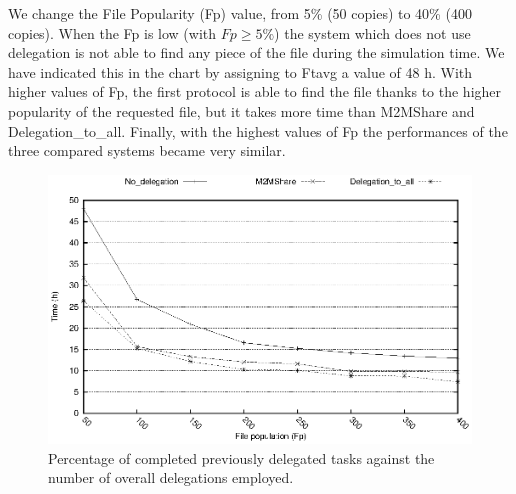 We change the File Popularity (Fp) value, from 5\% (50 copies) to 40\% (400 copies). When the Fp is low (with $Fp \geq 5\%$) the system which does not use delegation is not able to find any piece of the file during the simulation time. We have indicated this in the chart by assigning to Ftavg a value of 48 h. With higher values of Fp, the first protocol is able to find the file thanks to the higher popularity of the requested file, but it takes more time than M2MShare and Delegation\_to\_all. Finally, with the highest values of Fp the performances of the three compared systems became very similar. 
\begin{figure}[htbp]
  \begin{center}
    \includegraphics{grafici/tempiVFDiversaPop.eps}
    \caption{Percentage of completed previously delegated tasks against the number of overall delegations employed.}
    \label{graficoPopVariabile}
  \end{center}
\end{figure}


\newpage

